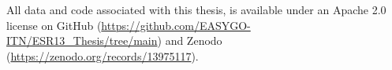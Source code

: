 All data and code associated with this thesis, is available under an Apache 2.0 license on GitHub (\url{https://github.com/EASYGO-ITN/ESR13_Thesis/tree/main}) and Zenodo (\url{https://zenodo.org/records/13975117}). 